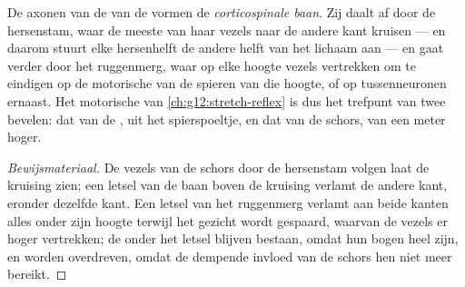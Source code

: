 \begin{proposition}\label{prop:g12:brain-and-movement:pathway}
De axonen van de  van de  vormen de
\emph{corticospinale baan}. Zij daalt af door de
hersenstam, waar de meeste van haar vezels naar de andere kant kruisen ---
en daarom stuurt elke hersenhelft de andere helft van het lichaam aan ---
en gaat verder door het ruggenmerg, waar op elke hoogte vezels vertrekken
om te eindigen op de motorische  van de spieren van die hoogte, of
op tussenneuronen ernaast. Het motorische  van
\cref{ch:g12:stretch-reflex} is dus het trefpunt van twee bevelen: dat van
de , uit het spierspoeltje, en dat van de schors, van een meter
hoger.
\end{proposition}
\begin{proof}[Bewijsmateriaal]
De vezels van de schors door de hersenstam volgen laat de kruising zien;
een letsel van de baan boven de kruising verlamt de andere kant, eronder
dezelfde kant. Een letsel van het ruggenmerg verlamt aan beide kanten
alles onder zijn hoogte terwijl het gezicht wordt gespaard, waarvan de
vezels er hoger vertrekken; de  onder het letsel blijven bestaan,
omdat hun bogen heel zijn, en worden overdreven, omdat de dempende invloed
van de schors hen niet meer bereikt.
\end{proof}

